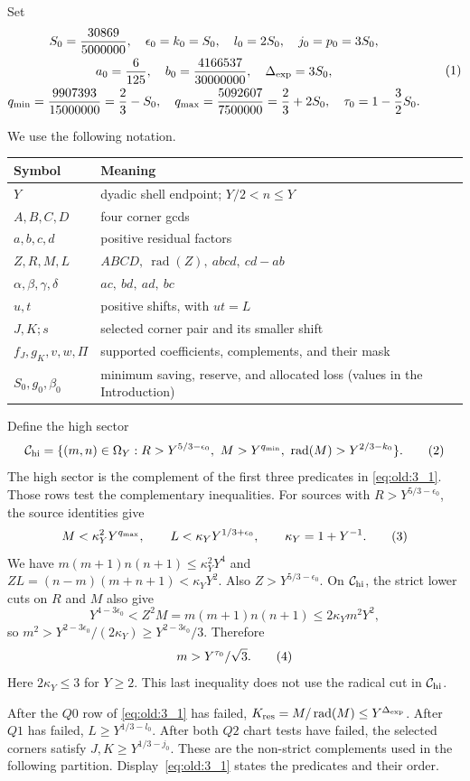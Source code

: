 Set
\[
\begin{gathered}
S_0=\frac{30869}{5000000},\quad
\epsilon_0=k_0=S_0,\quad l_0=2S_0,\quad j_0=p_0=3S_0,\\
a_0=\frac6{125},\quad b_0=\frac{4166537}{30000000},\quad
\Delta_{\rm exp}=3S_0,\\
q_{\min}=\frac{9907393}{15000000}=\frac23-S_0,\quad
q_{\max}=\frac{5092607}{7500000}=\frac23+2S_0,\quad
\tau_0=1-\frac32S_0 .
\end{gathered}\AutoTag{eq:old:2_5}
\]
\begin{samepage}
We use the following notation.
\begin{center}
\small
\begin{tabular}{@{}ll@{}}
Symbol & Meaning\\
\hline
\(Y\) & dyadic shell endpoint; \(Y/2<n\le Y\)\\
\(A,B,C,D\) & four corner gcds\\
\(a,b,c,d\) & positive residual factors\\
\(Z,R,M,L\) & \(ABCD,\ \operatorname{rad}(Z),\ abcd,\ cd-ab\)\\
\(\alpha,\beta,\gamma,\delta\) & \(ac,\ bd,\ ad,\ bc\)\\
\(u,t\) & positive shifts, with \(ut=L\)\\
\(J,K;s\) & selected corner pair and its smaller shift\\
\(f_J,g_K,v,w,\Pi\) & supported coefficients, complements, and their mask\\
\(S_0,g_0,\beta_0\) & minimum saving, reserve, and allocated loss (values in the Introduction)\\
\end{tabular}
\end{center}
\end{samepage}
Define the high sector
\[
\mathcal C_{\rm hi}=\{(m,n)\in\Omega_Y:
R>Y^{5/3-\epsilon_0},\
M>Y^{q_{\min}},\
\operatorname{rad}(M)>Y^{2/3-k_0}\}.
\AutoTag{eq:old:2_6}
\]
The high sector is the complement of the first three predicates in
\eqref{eq:old:3_1}. Those rows test the complementary inequalities.
For sources with \(R>Y^{5/3-\epsilon_0}\), the source identities give
\[
M<\kappa_Y^2Y^{q_{\max}},\qquad
L<\kappa_YY^{1/3+\epsilon_0},\qquad \kappa_Y=1+Y^{-1}.
\AutoTag{eq:old:2_7}
\]
We have \(m(m+1)n(n+1)\le\kappa_Y^2Y^4\) and
\(ZL=(n-m)(m+n+1)<\kappa_YY^2\). Also
\(Z>Y^{5/3-\epsilon_0}\). On \(\mathcal C_{\rm hi}\), the strict lower
cuts on \(R\) and \(M\) also give
\[
Y^{4-3\epsilon_0}<Z^2M=m(m+1)n(n+1)
                       \le2\kappa_Ym^2Y^2,
\]
so \(m^2>Y^{2-3\epsilon_0}/(2\kappa_Y)
\ge Y^{2-3\epsilon_0}/3\). Therefore
\[
m>Y^{\tau_0}/\sqrt3.\AutoTag{eq:old:2_8}
\]
Here \(2\kappa_Y\le3\) for \(Y\ge2\). This last inequality does not
use the radical cut in \(\mathcal C_{\rm hi}\).

After the \(Q0\) row of \eqref{eq:old:3_1} has failed,
\(K_{\rm res}=M/\operatorname{rad}(M)
\le Y^{\Delta_{\rm exp}}\). After \(Q1\) has failed,
\(L\ge Y^{1/3-l_0}\). After both \(Q2\) chart tests have failed, the
selected corners satisfy \(J,K\ge Y^{1/3-j_0}\). These are the
non-strict complements used in the following partition.
Display~\eqref{eq:old:3_1} states the predicates and their order.
